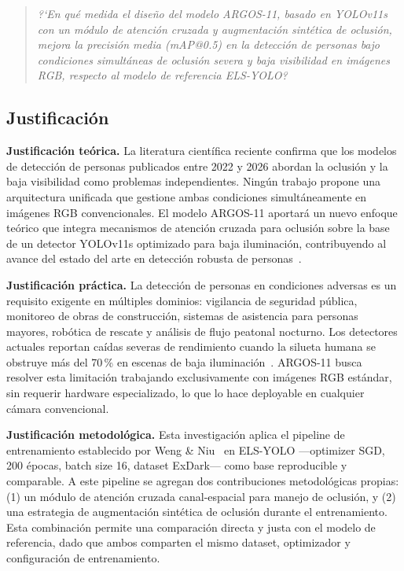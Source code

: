 \begin{quote}
\textit{?`En qu\'e medida el dise\~{n}o del modelo ARGOS-11, basado
en YOLOv11s con un m\'odulo de atenci\'on cruzada y augmentaci\'on
sint\'etica de oclusi\'on, mejora la precisi\'on media (mAP@0.5)
en la detecci\'on de personas bajo condiciones simult\'aneas de
oclusi\'on severa y baja visibilidad en im\'agenes RGB, respecto al
modelo de referencia ELS-YOLO?}
\end{quote}

\subsection{Justificaci\'on}

\textbf{Justificaci\'on te\'orica.}
La literatura cient\'{i}fica reciente confirma que los modelos de
detecci\'on de personas publicados entre 2022 y 2026 abordan la
oclusi\'on y la baja visibilidad como problemas independientes.
Ning\'un trabajo propone una arquitectura unificada que gestione
ambas condiciones simult\'aneamente en im\'agenes RGB
convencionales. El modelo ARGOS-11 aportar\'a un nuevo enfoque
te\'orico que integra mecanismos de atenci\'on cruzada para
oclusi\'on sobre la base de un detector YOLOv11s optimizado para
baja iluminaci\'on, contribuyendo al avance del estado del arte en
detecci\'on robusta de personas~\cite{ElsYolo2025, Deng2024}.

\textbf{Justificaci\'on pr\'actica.}
La detecci\'on de personas en condiciones adversas es un requisito
exigente en m\'ultiples dominios: vigilancia de seguridad p\'ublica,
monitoreo de obras de construcci\'on, sistemas de asistencia para
personas mayores, rob\'otica de rescate y an\'alisis de flujo
peatonal nocturno. Los detectores actuales reportan ca\'{i}das
severas de rendimiento cuando la silueta humana se obstruye m\'as
del 70\,\% en escenas de baja iluminaci\'on~\cite{Kim2025, Tang2026}.
ARGOS-11 busca resolver esta limitaci\'on trabajando exclusivamente
con im\'agenes RGB est\'andar, sin requerir hardware especializado,
lo que lo hace deployable en cualquier c\'amara convencional.

\textbf{Justificaci\'on metodol\'ogica.}
Esta investigaci\'on aplica el pipeline de entrenamiento
establecido por Weng \& Niu~\cite{ElsYolo2025} en ELS-YOLO
---optimizer SGD, 200 \'epocas, batch size 16, dataset ExDark---
como base reproducible y comparable. A este pipeline se agregan dos
contribuciones metodol\'ogicas propias: (1) un m\'odulo de
atenci\'on cruzada canal-espacial para manejo de oclusi\'on, y
(2) una estrategia de augmentaci\'on sint\'etica de oclusi\'on
durante el entrenamiento. Esta combinaci\'on permite una
comparaci\'on directa y justa con el modelo de referencia, dado
que ambos comparten el mismo dataset, optimizador y
configuraci\'on de entrenamiento.

